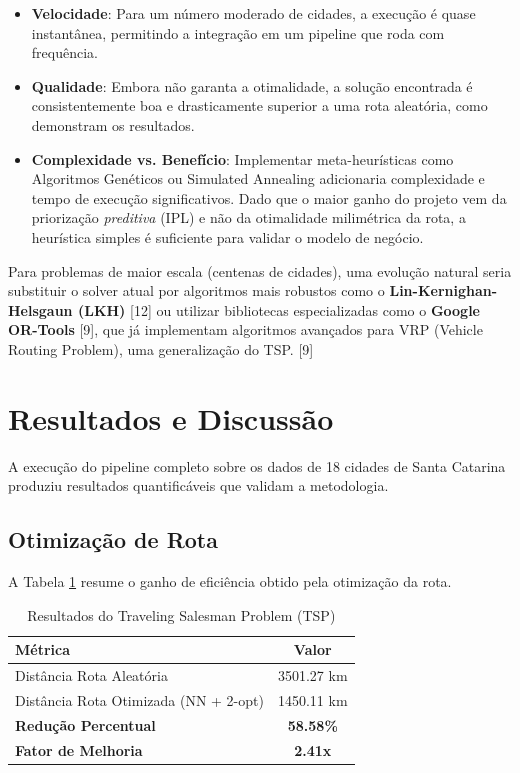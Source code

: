 \documentclass[11pt,a4paper,twocolumn]{article}
\begin{document}
\begin{itemize}
    \item \textbf{Velocidade}: Para um número moderado de cidades, a execução é quase instantânea, permitindo a integração em um pipeline que roda com frequência.
    \item \textbf{Qualidade}: Embora não garanta a otimalidade, a solução encontrada é consistentemente boa e drasticamente superior a uma rota aleatória, como demonstram os resultados.
    \item \textbf{Complexidade vs. Benefício}: Implementar meta-heurísticas como Algoritmos Genéticos ou Simulated Annealing adicionaria complexidade e tempo de execução significativos. Dado que o maior ganho do projeto vem da priorização \textit{preditiva} (IPL) e não da otimalidade milimétrica da rota, a heurística simples é suficiente para validar o modelo de negócio.
\end{itemize}

Para problemas de maior escala (centenas de cidades), uma evolução natural seria substituir o solver atual por algoritmos mais robustos como o \textbf{Lin-Kernighan-Helsgaun (LKH)} [12] ou utilizar bibliotecas especializadas como o \textbf{Google OR-Tools} [9], que já implementam algoritmos avançados para VRP (Vehicle Routing Problem), uma generalização do TSP. [9]

\section{Resultados e Discussão}

A execução do pipeline completo sobre os dados de 18 cidades de Santa Catarina produziu resultados quantificáveis que validam a metodologia.

\subsection{Otimização de Rota}
A Tabela \ref{tab:resultados_tsp} resume o ganho de eficiência obtido pela otimização da rota.

\begin{table}[H]
\centering
\caption{Resultados do Traveling Salesman Problem (TSP)}
\label{tab:resultados_tsp}
\begin{tabular}{|l|c|}
\hline
\textbf{Métrica} & \textbf{Valor} \\
\hline
Distância Rota Aleatória & 3501.27 km \\
Distância Rota Otimizada (NN + 2-opt) & 1450.11 km \\
\textbf{Redução Percentual} & \textbf{58.58\%} \\
\textbf{Fator de Melhoria} & \textbf{2.41x} \\
\hline
\end{tabular}
\end{table}
\end{document}
